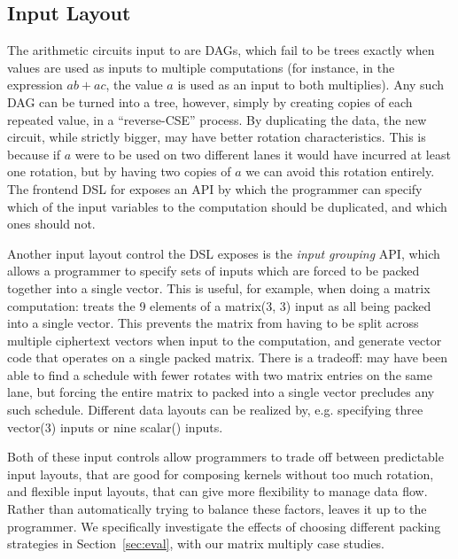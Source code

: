 \subsection{Input Layout}\label{sec:duplicating-inputs}
The arithmetic circuits input to \system are DAGs, which fail to be trees exactly when values are used as inputs to multiple computations (for instance, in the expression $ab + ac$, the value $a$ is used as an input to both multiplies).
Any such DAG can be turned into a tree, however, simply by creating copies of each repeated value, in a ``reverse-CSE'' process.
By duplicating the data, the new circuit, while strictly bigger, may have better rotation characteristics.
This is because if $a$ were to be used on two different lanes it would have incurred at least one rotation, but by having two copies of $a$ we can avoid this rotation entirely. The frontend DSL for \system exposes an API by which the programmer can specify which of the input variables to the computation should be duplicated, and which ones should not.

Another input layout control the \system DSL exposes is the {\em input grouping} API, which allows a programmer to specify sets of inputs which are forced to be packed together into a single vector.
This is useful, for example, when doing a matrix computation: \system treats the 9 elements of a {\sf matrix(3, 3)} input as all being packed into a single vector.
This prevents the matrix from having to be split across multiple ciphertext vectors when input to the computation, and generate vector code that operates on a single packed matrix.
There is a tradeoff: \system may have been able to find a schedule with fewer rotates with two matrix entries on the same lane, but forcing the entire matrix to packed into a single vector precludes any such schedule.
Different data layouts can be realized by, e.g. specifying three {\sf vector(3)} inputs or nine {\sf scalar()} inputs.

Both of these input controls allow programmers to trade off between predictable input layouts, that are good for composing kernels without too much rotation, and flexible input layouts, that can give \system more flexibility to manage data flow. Rather than automatically trying to balance these factors, \system leaves it up to the programmer.
We specifically investigate the effects of choosing different packing strategies in Section~\ref{sec:eval}, with our matrix multiply case studies.



